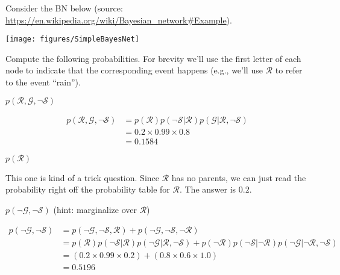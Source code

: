\documentclass[assignment02_Solutions]{subfiles}
\begin{document}
\begin{exercise}[(20 minutes)]
Consider the BN below (source: \url{https://en.wikipedia.org/wiki/Bayesian_network\#Example}).

\begin{center}
\texttt{[image: figures/SimpleBayesNet]}
\end{center}

Compute the following probabilities.  For brevity we'll use the first letter of each node to indicate that the corresponding event happens (e.g., we'll use $\mathcal{R}$ to refer to the event ``rain'').
\bes
\item $p(\mathcal{R}, \mathcal{G}, \neg \mathcal{S})$
\begin{boxedsolution}
\begin{align}
p(\mathcal{R}, \mathcal{G}, \neg \mathcal{S}) &= p(\mathcal{R}) p(\neg \mathcal{S} | \mathcal{R}) p(\mathcal{G} | \mathcal{R}, \neg \mathcal{S}) \nonumber \\
&= 0.2 \times 0.99 \times 0.8 \nonumber \\
&= 0.1584 \nonumber
\end{align}
\end{boxedsolution}
\item $p(\mathcal{R})$
\begin{boxedsolution}
This one is kind of a trick question.  Since $\mathcal{R}$ has no parents, we can just read the probability right off the probability table for $\mathcal{R}$.  The answer is $0.2$.
\end{boxedsolution}
\item $p(\neg \mathcal{G}, \neg \mathcal{S})$ (hint: marginalize over $\mathcal{R}$)

\begin{boxedsolution}
\begin{align}
p(\neg \mathcal{G}, \neg \mathcal{S}) &= p(\neg \mathcal{G}, \neg \mathcal{S}, \mathcal{R}) + p(\neg \mathcal{G}, \neg \mathcal{S}, \neg \mathcal{R}) \nonumber \\
&= p(\mathcal{R}) p(\neg \mathcal{S} | \mathcal{R}) p (\neg \mathcal{G} | \mathcal{R}, \neg \mathcal{S} ) + p(\neg \mathcal{R}) p(\neg \mathcal{S} | \neg \mathcal{R}) p (\neg \mathcal{G} | \neg \mathcal{R}, \neg \mathcal{S} ) \nonumber \\
&= \left ( 0.2 \times 0.99 \times 0.2 \right ) + \left ( 0.8 \times 0.6 \times 1.0 \right ) \nonumber \\
&= 0.5196 \nonumber
\end{align}
\end{boxedsolution}

\ees

\end{exercise}
\end{document}
